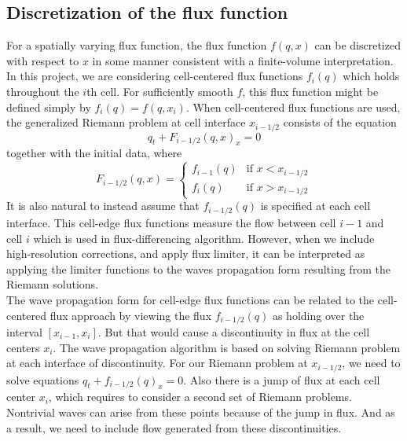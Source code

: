 \documentclass{article}
\begin{document}
\subsection{Discretization of the flux function}
	For a spatially varying flux function, the flux function $f(q,x)$ can be discretized with respect to $x$ in some manner consistent with a finite-volume interpretation. In this project, we are considering cell-centered flux functions $f_i(q)$ which holds throughout the $i$th cell. For sufficiently smooth $f$, this flux function might be defined simply by $f_i(q)=f(q,x_i)$. When cell-centered flux functions are used, the generalized Riemann problem at cell interface $x_{i-1/2}$ consists of the equation
	\[
	q_t + F_{i-1/2}(q,x)_x=0
	\]
	together with the initial data, where
	\[
	F_{i-1/2}(q,x)=\begin{cases}f_{i-1}(q) & \text{if } x<x_{i-1/2}\\
	f_i(q) & \text{if } x>x_{i-1/2}\end{cases}
	\]
	It is also natural to instead assume that $f_{i-1/2}(q)$ is specified at each cell interface. This cell-edge flux functions measure the flow between cell $i-1$ and cell $i$ which is used in flux-differencing algorithm. However, when we include high-resolution corrections, and apply flux limiter, it can be interpreted as applying the limiter functions to the waves propagation form resulting from the Riemann solutions.\\
	
	\noindent The wave propagation form for cell-edge flux functions can be related to the cell-centered flux approach by viewing the flux $f_{i-1/2}(q)$ as holding over the interval $[x_{i-1},x_i]$. But that would cause a discontinuity in flux at the cell centers $x_i$. The wave propagation algorithm is based on solving Riemann problem at each interface of discontinuity. For our Riemann problem at $x_{i-1/2}$, we need to solve equations $q_t+f_{i-1/2}(q)_x=0$. Also there is a jump of flux at each cell center $x_i$, which requires to consider a second set of Riemann problems. Nontrivial waves can arise from these points because of the jump in flux. And as a result, we need to include flow generated from these discontinuities.
\end{document}
